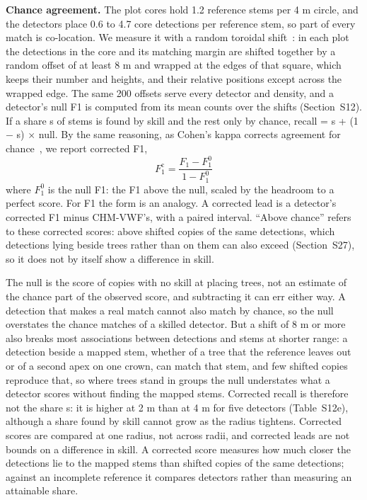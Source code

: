 \documentclass[journal]{IEEEtran}
\begin{document}
\textbf{Chance agreement.} The plot cores hold 1.2 reference stems per 4 m circle,
and the detectors place 0.6 to 4.7 core detections per reference stem, so part
of every match is co-location. We measure it with a random toroidal shift~\cite{lotwick1982methods,wiegand2004rings}: in each plot the detections in the
core and its matching margin are shifted together by a random offset of at
least 8 m and wrapped at the edges of that square, which keeps their number
and heights, and their relative positions except across the wrapped edge. The
same 200 offsets serve every detector and density, and a detector's null F1 is
computed from its mean counts over the shifts (Section~S12). If a share s of
stems is found by skill and the rest only by chance, recall = s + (1 $-$ s) $\times$
null. By the same reasoning, as Cohen's kappa corrects agreement for chance~\cite{cohen1960coefficient}, we report corrected F1,
\begin{equation}
F_1^{\mathrm{c}} = \frac{F_1 - F_1^{0}}{1 - F_1^{0}}
\end{equation}
where \(F_1^{0}\) is the null F1: the F1 above the null, scaled by the headroom to
a perfect score. For F1 the form is an analogy. A corrected lead is a detector's
corrected F1 minus CHM-VWF's, with a paired interval. ``Above chance'' refers to
these corrected scores: above shifted copies of the same detections, which
detections lying beside trees rather than on them can also exceed (Section~S27), so it does not by itself show a difference in skill.

The null is the score of copies with no skill at placing trees, not an estimate
of the chance part of the observed score, and subtracting it can err either way.
A detection that makes a real match cannot also match by chance, so the null
overstates the chance matches of a skilled detector. But a shift of 8 m or more
also breaks most associations between detections and stems at shorter range: a
detection beside a mapped stem, whether of a tree that the reference leaves out
or of a second apex on one crown, can match that stem, and few shifted copies
reproduce that, so where trees stand in groups the null understates what a
detector scores without finding the mapped stems. Corrected recall is therefore
not the share s: it is higher at 2 m than at 4 m for five detectors (Table~S12e), although a share found by skill cannot grow as the radius tightens.
Corrected scores are compared at one radius, not across radii, and corrected
leads are not bounds on a difference in skill. A corrected score measures how
much closer the detections lie to the mapped stems than shifted copies of the
same detections; against an incomplete reference it compares detectors rather
than measuring an attainable share.
\end{document}
